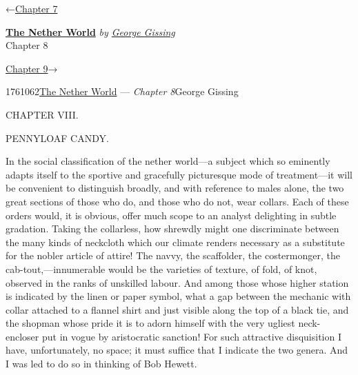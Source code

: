 \hypertarget{headerContainer}{}
\hypertarget{navigationHeader}{}
\protect\hypertarget{headerprevious}{}{←\href{/wiki/The_Nether_World/Volume_1/Chapter_7}{Chapter
7}}

\textbf{\protect\hypertarget{header_title_text}{}{\href{/wiki/The_Nether_World}{The
Nether World}}} \emph{by
\href{/wiki/Author:George_Gissing}{\protect\hypertarget{header_author_text}{}{{George
Gissing}}}}\\
\protect\hypertarget{header_section_text}{}{Chapter 8}

\protect\hypertarget{headernext}{}{\href{/wiki/The_Nether_World/Volume_1/Chapter_9}{Chapter
9}→}

\hypertarget{navigationNotes}{}

\hypertarget{ws-data}{}
\protect\hypertarget{ws-article-id}{}{1761062}\protect\hypertarget{ws-title}{}{\href{/wiki/The_Nether_World}{The
Nether World} --- \emph{Chapter
8}}\protect\hypertarget{ws-author}{}{George Gissing}

{\protect\hypertarget{166}{}{}}

{CHAPTER VIII.}

PENNYLOAF CANDY.

In the social classification of the nether world---a subject which so
eminently adapts itself to the sportive and gracefully picturesque mode
of treatment---it will be convenient to distinguish broadly, and with
reference to males alone, the two great sections of those who do, and
those who do not, wear collars. Each of these orders would, it is
obvious, offer much scope to an analyst delighting in subtle gradation.
Taking the collarless, how shrewdly might one discriminate between the
many kinds of neckcloth which our climate renders necessary as a
substitute for the nobler article of attire! The navvy, the scaffolder,
the costermonger, the cab-tout,---innumerable would be the varieties of
texture, of fold, of knot, observed in the ranks of
{\protect\hypertarget{167}{}{}}unskilled labour. And among those whose
higher station is indicated by the linen or paper symbol, what a gap
between the mechanic with collar attached to a flannel shirt and just
visible along the top of a black tie, and the shopman whose pride it is
to adorn himself with the very ugliest neck-encloser put in vogue by
aristocratic sanction! For such attractive disquisition I have,
unfortunately, no space; it must suffice that I indicate the two genera.
And I was led to do so in thinking of Bob Hewett.

